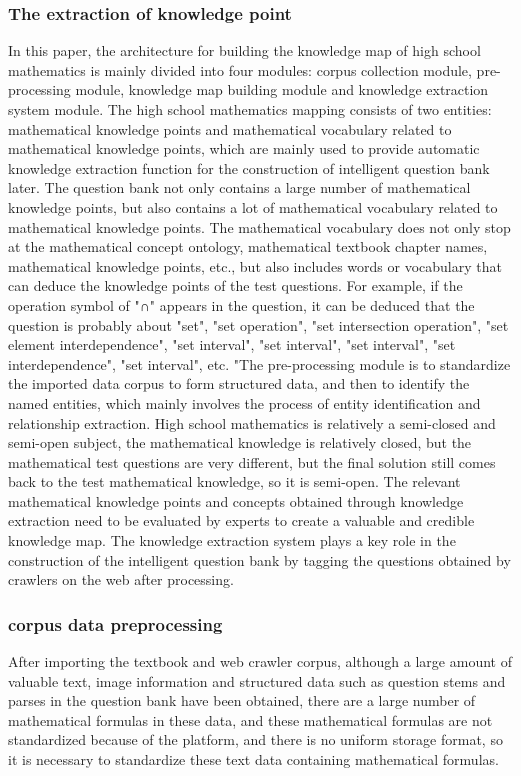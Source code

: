\documentclass[11pt,en]{elegantpaper}
\begin{document}
\subsubsection{The extraction of knowledge point}
In this paper, the architecture for building the knowledge map of high school mathematics is mainly divided into four modules: corpus collection module, pre-processing module, knowledge map building module and knowledge extraction system module. The high school mathematics mapping consists of two entities: mathematical knowledge points and mathematical vocabulary related to mathematical knowledge points, which are mainly used to provide automatic knowledge extraction function for the construction of intelligent question bank later. The question bank not only contains a large number of mathematical knowledge points, but also contains a lot of mathematical vocabulary related to mathematical knowledge points. The mathematical vocabulary does not only stop at the mathematical concept ontology, mathematical textbook chapter names, mathematical knowledge points, etc., but also includes words or vocabulary that can deduce the knowledge points of the test questions. For example, if the operation symbol of "∩" appears in the question, it can be deduced that the question is probably about "set", "set operation", "set intersection operation", "set element interdependence", "set interval", "set interval", "set interval", "set interdependence", "set interval", etc. "The pre-processing module is to standardize the imported data corpus to form structured data, and then to identify the named entities, which mainly involves the process of entity identification and relationship extraction. High school mathematics is relatively a semi-closed and semi-open subject, the mathematical knowledge is relatively closed, but the mathematical test questions are very different, but the final solution still comes back to the test mathematical knowledge, so it is semi-open. The relevant mathematical knowledge points and concepts obtained through knowledge extraction need to be evaluated by experts to create a valuable and credible knowledge map. The knowledge extraction system plays a key role in the construction of the intelligent question bank by tagging the questions obtained by crawlers on the web after processing. 

\subsubsection{corpus data preprocessing}
After importing the textbook and web crawler corpus, although a large amount of valuable text, image information and structured data such as question stems and parses in the question bank have been obtained, there are a large number of mathematical formulas in these data, and these mathematical formulas are not standardized because of the platform, and there is no uniform storage format, so it is necessary to standardize these text data containing mathematical formulas.
\end{document}
